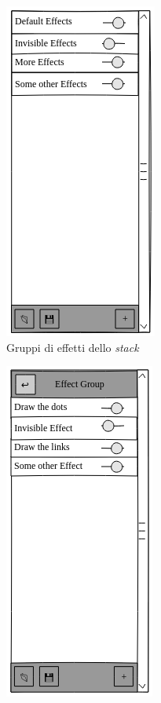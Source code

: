 \documentclass[%
]{beamer}
\newcommand{\engEmph}[1] {\emph{\foreignlanguage{english}#1}}
\begin{document}
            \begin{frame}
                \begin{figure}[htbp]
                    \captionsetup[subfigure]{labelformat=empty}
                    \centering%
                    \begin{subfigure}{.2\textwidth}
                        \includegraphics[scale=0.4]{mock/crop/groups}
                        \caption{Gruppi di effetti dello \engEmph{stack}}
                        \label{fig:mock:groups}
                    \end{subfigure}
                    \qquad{\LARGE$\Rightarrow$}\qquad
                    \pause
                    \begin{subfigure}{.2\textwidth}
                        \includegraphics[scale=0.4]{mock/crop/effects}

\end{subfigure}
\end{figure}
\end{frame}
\end{document}
